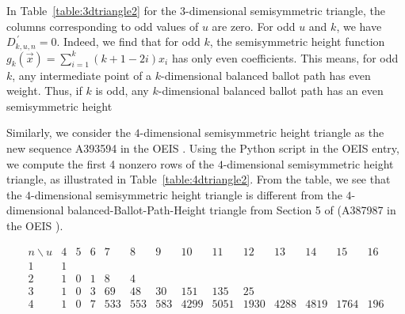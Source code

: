 \documentclass[11pt]{article}
\theoremstyle{remark}
\theoremstyle{definition}
\begin{document}
In Table~\ref{table:3dtriangle2} for the $3$-dimensional semisymmetric triangle, the columns corresponding to odd values of $u$ are zero. For odd $u$ and $k$, we have $D_{k, u, n}^{\,\prime} = 0$. Indeed, we find that for odd $k$, the semisymmetric height function $g_k(\vec{x}) = \sum_{i=1}^{k}(k+1-2i)x_i$ has only even coefficients. This means, for odd $k$, any intermediate point of a $k$-dimensional balanced ballot path has even weight. Thus, if $k$ is odd, any $k$-dimensional balanced ballot path has an even semisymmetric height


Similarly, we consider the $4$-dimensional semisymmetric height triangle as the new sequence A393594 in the OEIS \cite{oeis}. Using the Python script in the OEIS entry, we compute the first 4 nonzero rows of the $4$-dimensional semisymmetric height triangle, as illustrated in Table~\ref{table:4dtriangle2}. From the table, we see that the $4$-dimensional semisymmetric height triangle is different from the $4$-dimensional balanced-Ballot-Path-Height triangle from Section 5 of \cite{MR5034574} (A387987 in the OEIS \cite{oeis}).
\begin{table}[H]
    \centering
  \[
\begin{array}{c|cccccccccccccc} n \backslash u & 4 & 5 & 6 & 7 & 8 & 9 & 10 & 11 & 12 & 13 & 14 & 15 & 16\\
\hline
1 & 1\\
2 & 1 & 0 & 1 & 8 & 4 \\
3 & 1 & 0 & 3 & 69 & 48 & 30 & 151 & 135 & 25 \\4 & 
1 & 0 & 7 & 533 & 553 & 583 & 4299 & 5051 & 1930 & 4288 & 4819 & 1764 & 196
\end{array}
\]

    \caption{Some entries $D'_{4, u, n}$ of the 4-dimensional semisymmetric height triangle. Parameter $u$ stands for semisymmetric height.}
    \label{table:4dtriangle2}
\end{table}
\end{document}
